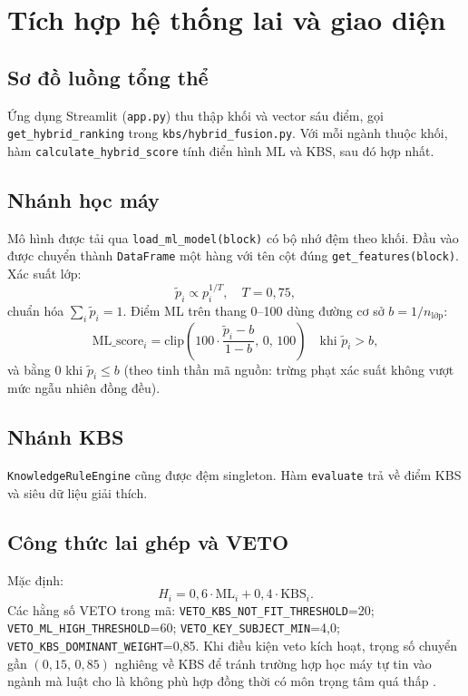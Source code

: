 \chapter{Tích hợp hệ thống lai và giao diện}

\section{Sơ đồ luồng tổng thể}
Ứng dụng Streamlit (\texttt{app.py}) thu thập khối và vector sáu điểm, gọi \texttt{get\_hybrid\_ranking} trong \texttt{kbs/hybrid\_fusion.py}. Với mỗi ngành thuộc khối, hàm \texttt{calculate\_hybrid\_score} tính điển hình ML và KBS, sau đó hợp nhất.

\section{Nhánh học máy}
Mô hình được tải qua \texttt{load\_ml\_model(block)} có bộ nhớ đệm theo khối. Đầu vào được chuyển thành \texttt{DataFrame} một hàng với tên cột đúng \texttt{get\_features(block)}. Xác suất lớp:
\[
\tilde{p}_i \propto p_i^{1/T}, \quad T=0{,}75,
\]
chuẩn hóa $\sum_i \tilde{p}_i=1$. Điểm ML trên thang 0--100 dùng đường cơ sở $b=1/n_{\text{lớp}}$:
\[
\text{ML\_score}_i = \mathrm{clip}\left(100\cdot\frac{\tilde{p}_i-b}{1-b},\,0,\,100\right) \quad \text{khi } \tilde{p}_i>b,
\]
và bằng 0 khi $\tilde{p}_i\leq b$ (theo tinh thần mã nguồn: trừng phạt xác suất không vượt mức ngẫu nhiên đồng đều).

\section{Nhánh KBS}
\texttt{KnowledgeRuleEngine} cũng được đệm singleton. Hàm \texttt{evaluate} trả về điểm KBS và siêu dữ liệu giải thích.

\section{Công thức lai ghép và VETO}
Mặc định:
\[
H_i = 0{,}6\cdot \text{ML}_i + 0{,}4\cdot \text{KBS}_i.
\]
Các hằng số VETO trong mã: \texttt{VETO\_KBS\_NOT\_FIT\_THRESHOLD}=20; \texttt{VETO\_ML\_HIGH\_THRESHOLD}=60; \texttt{VETO\_KEY\_SUBJECT\_MIN}=4{,}0; \texttt{VETO\_KBS\_DOMINANT\_WEIGHT}=0{,}85. Khi điều kiện veto kích hoạt, trọng số chuyển gần $(0{,}15,\,0{,}85)$ nghiêng về KBS để tránh trường hợp học máy tự tin vào ngành mà luật cho là không phù hợp đồng thời có môn trọng tâm quá thấp \cite{docs_ai}.

